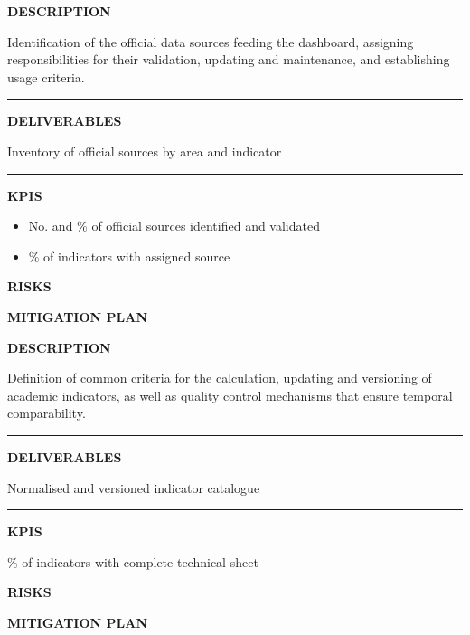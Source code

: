 \documentclass[11pt,a4paper]{scrreprt}
\newcommand{\fieldlabel}[1]{%
  {\footnotesize\sffamily\bfseries\color{mutedcolor}\MakeUppercase{#1}}\par\nopagebreak[4]
}
\newcommand{\fieldsep}{\vspace{3pt}\noindent\textcolor{bordercolor}{\rule{\linewidth}{0.4pt}}\vspace{3pt}\par}
\begin{document}
\begin{tcolorbox}[pabox={dashcolor}{A.P.3.1 \enspace\textbullet\enspace Identification and Validation of Official Data Sources}]

\fieldlabel{Description}
{\small Identification of the official data sources feeding the dashboard, assigning responsibilities for their validation, updating and maintenance, and establishing usage criteria.}\par
\fieldsep
\fieldlabel{Deliverables}
{\small Inventory of official sources by area and indicator}\par
\fieldsep
\fieldlabel{KPIs}
{\small \begin{itemize}[noitemsep,topsep=2pt]
\item No. and \% of official sources identified and validated
\item \% of indicators with assigned source
\end{itemize}}\par
\end{tcolorbox}
\begin{tcolorbox}[riskbox]
{\footnotesize\sffamily\bfseries\color{red!50!black} RISKS}\par{}
\end{tcolorbox}
\begin{tcolorbox}[mitbox]
{\footnotesize\sffamily\bfseries\color{green!40!black} MITIGATION PLAN}\par{}
\end{tcolorbox}
\vspace{8pt}

\begin{tcolorbox}[pabox={dashcolor}{A.P.3.2 \enspace\textbullet\enspace Normalisation, Versioning and Control of Academic Indicators}]

\fieldlabel{Description}
{\small Definition of common criteria for the calculation, updating and versioning of academic indicators, as well as quality control mechanisms that ensure temporal comparability.}\par
\fieldsep
\fieldlabel{Deliverables}
{\small Normalised and versioned indicator catalogue}\par
\fieldsep
\fieldlabel{KPIs}
{\small \% of indicators with complete technical sheet}\par
\end{tcolorbox}
\begin{tcolorbox}[riskbox]
{\footnotesize\sffamily\bfseries\color{red!50!black} RISKS}\par{}
\end{tcolorbox}
\begin{tcolorbox}[mitbox]
{\footnotesize\sffamily\bfseries\color{green!40!black} MITIGATION PLAN}\par{}
\end{tcolorbox}
\vspace{8pt}
\end{document}
